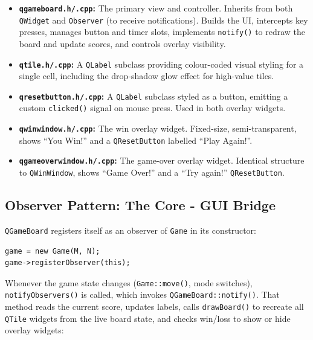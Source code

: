 \documentclass[a4paper,12pt]{article}
\begin{document}
\begin{itemize}

    \item \textbf{\texttt{qgameboard.h/.cpp}:} The primary view and controller. Inherits from both \texttt{QWidget} and \texttt{Observer} (to receive notifications). Builds the UI, intercepts key presses, manages button and timer slots, implements \texttt{notify()} to redraw the board and update scores, and controls overlay visibility.

    \item \textbf{\texttt{qtile.h/.cpp}:} A \texttt{QLabel} subclass providing colour-coded visual styling for a single cell, including the drop-shadow glow effect for high-value tiles.

    \item \textbf{\texttt{qresetbutton.h/.cpp}:} A \texttt{QLabel} subclass styled as a button, emitting a custom \texttt{clicked()} signal on mouse press. Used in both overlay widgets.

    \item \textbf{\texttt{qwinwindow.h/.cpp}:} The win overlay widget. Fixed-size, semi-transparent, shows ``You Win!'' and a \texttt{QResetButton} labelled ``Play Again!''. 

    \item \textbf{\texttt{qgameoverwindow.h/.cpp}:} The game-over overlay widget. Identical structure to \texttt{QWinWindow}, shows ``Game Over!'' and a ``Try again!'' \texttt{QResetButton}.
\end{itemize}

\subsection{Observer Pattern: The Core - GUI Bridge}

\texttt{QGameBoard} registers itself as an observer of \texttt{Game} in its constructor:

\begin{lstlisting}[style=CppStyle]
game = new Game(M, N);
game->registerObserver(this);
\end{lstlisting}

Whenever the game state changes (\texttt{Game::move()}, mode switches), \texttt{notifyObservers()} is called, which invokes \texttt{QGameBoard::notify()}. That method reads the current score, updates labels, calls \texttt{drawBoard()} to recreate all \texttt{QTile} widgets from the live board state, and checks win/loss to show or hide overlay widgets:
\end{document}
